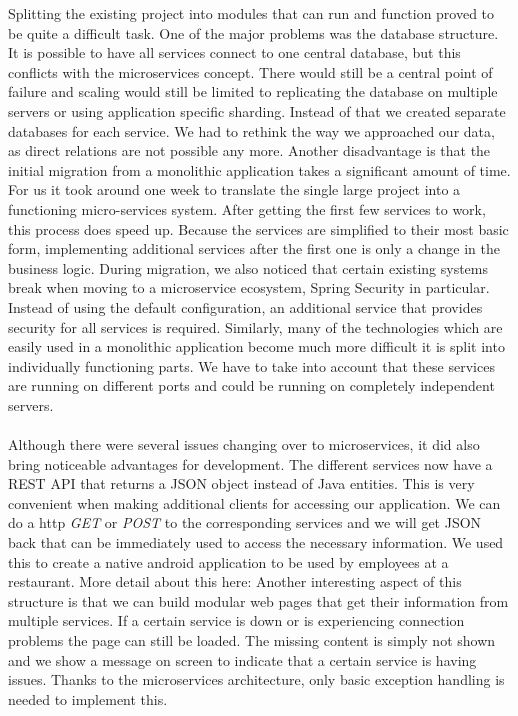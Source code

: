 \documentclass[12pt]{article}
\begin{document}
\begin{multicols}{2}
\noindent Splitting the existing project into modules that can run and function proved to be quite a difficult task. One of the major problems was the database structure. It is possible to have all services connect to one central database, but this conflicts with the microservices concept. There would still be a central point of failure and scaling would still be limited to replicating the database on multiple servers or using application specific sharding. Instead of that we created separate databases for each service. We had to rethink the way we approached our data, as direct relations are not possible any more. Another disadvantage is that the initial migration from a monolithic application takes a significant amount of time. For us it took around one week to translate the single large project into a functioning micro-services system. After getting the first few services to work, this process does speed up. Because the services are simplified to their most basic form, implementing additional services after the first one is only a change in the business logic. During migration, we also noticed that certain existing systems break when moving to a microservice ecosystem, Spring Security in particular. Instead of using the default configuration, an additional service that provides security for all services is required. Similarly, many of the technologies which are easily used in a monolithic application become much more difficult it is split into individually functioning parts. We have to take into account that these services are running on different ports and could be running on completely independent servers.
\\\\
Although there were several issues changing over to microservices, it did also bring noticeable advantages for development. The different services now have a REST API that returns a JSON object instead of Java entities. This is very convenient when making additional clients for accessing our application. We can do a http \textit{GET} or \textit{POST} to the corresponding services and we will get JSON back that can be immediately used to access the necessary information. We used this to create a native android application to be used by employees at a restaurant. More detail about this here: %
Another interesting aspect of this structure is that we can build modular web pages that get their information from multiple services. If a certain service is down or is experiencing connection problems the page can still be loaded. The missing content is simply not shown and we show a message on screen to indicate that a certain service is having issues. Thanks to the microservices architecture, only basic exception handling is needed to implement this.

\end{multicols}
\end{document}
